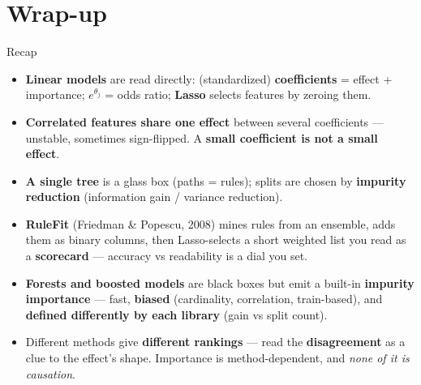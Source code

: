 \documentclass[aspectratio=169]{beamer}
\begin{document}
\section*{Wrap-up}

\begin{frame}{Recap}
  \begin{itemize}\small
    \item \textbf{Linear models} are read directly: (standardized) \textbf{coefficients} =
      effect + importance; $e^{\theta_j}$ = odds ratio; \textbf{Lasso} selects features by zeroing them.
    \item \textbf{Correlated features share one effect} between several coefficients --- unstable,
      sometimes sign-flipped. A \textbf{small coefficient is not a small effect}.
    \item \textbf{A single tree} is a glass box (paths = rules); splits are chosen by
      \textbf{impurity reduction} (information gain / variance reduction).
    \item \textbf{RuleFit} (Friedman \& Popescu, 2008) mines rules from an ensemble, adds them as
      binary columns, then Lasso-selects a short weighted list you read as a \textbf{scorecard}
      --- accuracy vs readability is a dial you set.
    \item \textbf{Forests and boosted models} are black boxes but emit a built-in
      \textbf{impurity importance} --- fast, \textbf{biased} (cardinality, correlation,
      train-based), and \textbf{defined differently by each library} (gain vs split count).
    \item Different methods give \textbf{different rankings} --- read the \textbf{disagreement} as
      a clue to the effect's shape. Importance is method-dependent, and \emph{none of it is causation}.
  \end{itemize}
  \vfill
\end{frame}
\end{document}
